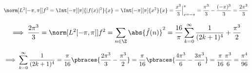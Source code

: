 \begin{solution}
\begin{enumerate}[label = \arabic*.]
    \begin{align*}
        \norm[{L^2[-\pi, \pi]}]{f}^2
        =
        \Int[-\pi][\pi]{|f(x)|^2}{x}
        =
        \Int[-\pi][\pi]{x^2}{x}
        =
        \frac{x^3}{3} \Big |_{x = -\pi}^\pi
        =
        \frac{\pi^3}{3} - \frac{(-\pi)^3}{3}
        =
        \frac{2 \pi^3}{3}
    \end{align*}

    \begin{align*}
        \implies
        \frac{2 \pi^3}{3}
        =
        \norm[{L^2[-\pi, \pi]}]{f}^2
        =
        \sum_{n \in \Z}
        \abs{\hat f(n)}^2
        =
        \frac{16}{\pi}
        \sum_{k=0}^\infty
        \frac{1}{(2 k + 1)^4}
        +
        \frac{\pi^3}{2}
    \end{align*}

    \begin{align*}
        \implies
        \sum_{k=0}^\infty
        \frac{1}{(2 k + 1)^4}
        =
        \frac{\pi}{16}
        \pbraces
        {
            \frac{2 \pi^3}{3}
            -
            \frac{\pi^3}{2}
        }
        =
        \frac{\pi}{16}
        \pbraces
        {
            \frac{4 \pi^3}{6}
            -
            \frac{3 \pi^3}{6}
        }
        =
        \frac{\pi}{16}
        \frac{\pi^3}{6}
        =
        \frac{\pi^4}{96}        
    \end{align*}

\end{enumerate}

\end{solution}

